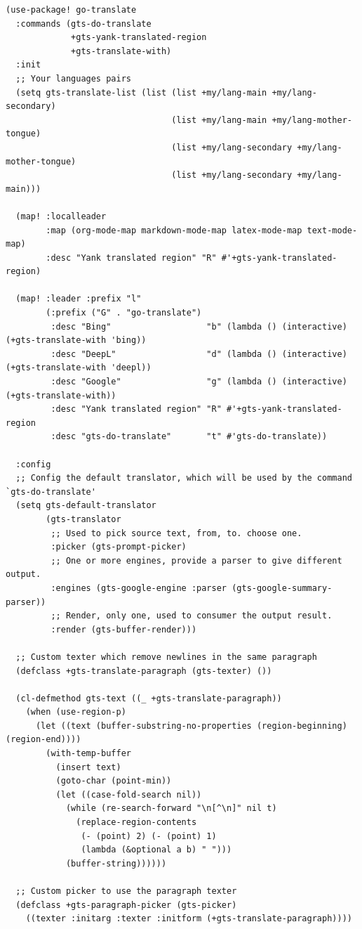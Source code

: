 \documentclass[11pt]{article}
\begin{document}
\begin{verbatim}
(use-package! go-translate
  :commands (gts-do-translate
             +gts-yank-translated-region
             +gts-translate-with)
  :init
  ;; Your languages pairs
  (setq gts-translate-list (list (list +my/lang-main +my/lang-secondary)
                                 (list +my/lang-main +my/lang-mother-tongue)
                                 (list +my/lang-secondary +my/lang-mother-tongue)
                                 (list +my/lang-secondary +my/lang-main)))

  (map! :localleader
        :map (org-mode-map markdown-mode-map latex-mode-map text-mode-map)
        :desc "Yank translated region" "R" #'+gts-yank-translated-region)

  (map! :leader :prefix "l"
        (:prefix ("G" . "go-translate")
         :desc "Bing"                   "b" (lambda () (interactive) (+gts-translate-with 'bing))
         :desc "DeepL"                  "d" (lambda () (interactive) (+gts-translate-with 'deepl))
         :desc "Google"                 "g" (lambda () (interactive) (+gts-translate-with))
         :desc "Yank translated region" "R" #'+gts-yank-translated-region
         :desc "gts-do-translate"       "t" #'gts-do-translate))

  :config
  ;; Config the default translator, which will be used by the command `gts-do-translate'
  (setq gts-default-translator
        (gts-translator
         ;; Used to pick source text, from, to. choose one.
         :picker (gts-prompt-picker)
         ;; One or more engines, provide a parser to give different output.
         :engines (gts-google-engine :parser (gts-google-summary-parser))
         ;; Render, only one, used to consumer the output result.
         :render (gts-buffer-render)))

  ;; Custom texter which remove newlines in the same paragraph
  (defclass +gts-translate-paragraph (gts-texter) ())

  (cl-defmethod gts-text ((_ +gts-translate-paragraph))
    (when (use-region-p)
      (let ((text (buffer-substring-no-properties (region-beginning) (region-end))))
        (with-temp-buffer
          (insert text)
          (goto-char (point-min))
          (let ((case-fold-search nil))
            (while (re-search-forward "\n[^\n]" nil t)
              (replace-region-contents
               (- (point) 2) (- (point) 1)
               (lambda (&optional a b) " ")))
            (buffer-string))))))

  ;; Custom picker to use the paragraph texter
  (defclass +gts-paragraph-picker (gts-picker)
    ((texter :initarg :texter :initform (+gts-translate-paragraph))))


\end{verbatim}
\end{document}
